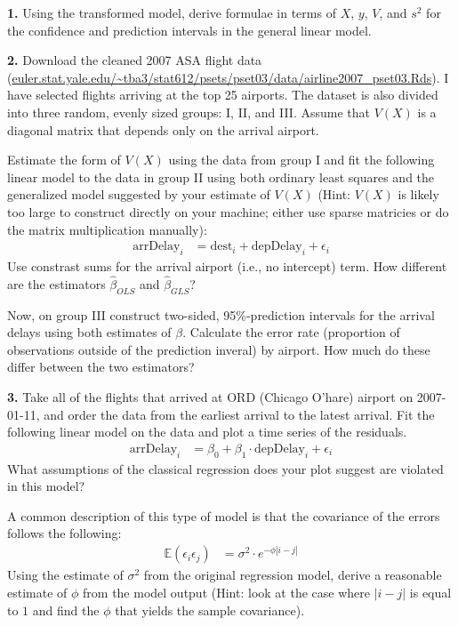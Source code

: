 \documentclass[12pt]{article}
\begin{document}
{\bf 1.} Using the transformed model, derive formulae in terms of $X$, $y$, $V$, and
$s^2$ for the confidence and prediction intervals in the general linear model.

{\bf 2.} Download the cleaned 2007 ASA flight data
(\url{euler.stat.yale.edu/~tba3/stat612/psets/pset03/data/airline2007_pset03.Rds}).
I have selected flights arriving at the top 25 airports. The dataset is
also divided into three random, evenly sized groups: I, II, and III.
Assume that $V(X)$ is a diagonal matrix that depends only on the arrival airport.

Estimate the form of $V(X)$ using the data from group I and fit the following linear
model to the data in group II using both ordinary least squares and the generalized
model suggested by your estimate of $V(X)$ (Hint: $V(X)$ is likely too large to
construct directly on your machine; either use sparse matricies or do the
matrix multiplication manually):
\begin{align}
\text{arrDelay}_i &= \text{dest}_i + \text{depDelay}_i + \epsilon_i \label{airlineMod}
\end{align}
Use constrast sums for the arrival airport (i.e., no intercept) term. How different
are the estimators $\widehat{\beta}_{OLS}$ and $\widehat{\beta}_{GLS}$?

Now, on group III construct two-sided, 95\%-prediction intervals for the arrival
delays using both estimates of $\beta$. Calculate the error rate (proportion of
observations outside of the prediction inveral) by airport. How much do
these differ between the two estimators?

{\bf 3.} Take all of the flights that arrived at ORD (Chicago O'hare) airport on
2007-01-11, and order the data from the earliest arrival to the latest arrival.
Fit the following linear model on the data and plot a time series of the residuals.
\begin{align}
\text{arrDelay}_i &= \beta_0 + \beta_1\cdot\text{depDelay}_i + \epsilon_i
\end{align}
What assumptions of the classical regression does your plot suggest are
violated in this model?

A common description of this type of model is that the covariance of the errors
follows the following:
\begin{align}
\mathbb{E}(\epsilon_i \epsilon_j) &= \sigma^2 \cdot e^{- \phi |i - j|}
\end{align}
Using the estimate of $\sigma^2$ from the original regression model, derive
a reasonable estimate of $\phi$ from the model output (Hint: look at the case
where $|i-j|$ is equal to $1$ and find the $\phi$ that yields the
sample covariance).
\end{document}

